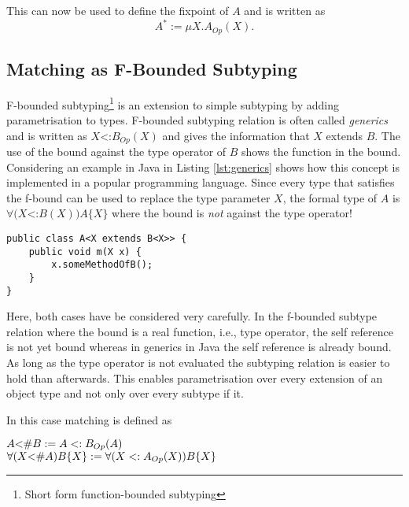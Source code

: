 This can now be used to define the fixpoint of $A$ and is written as \[A^*
:= \mu X.A_{Op}(X).\]


\subsection{Matching as F-Bounded Subtyping}
F-bounded subtyping\footnote{Short form function-bounded subtyping}
is an extension to simple subtyping by adding parametrisation to
types. F-bounded subtyping relation is often called \emph{generics}
and is written as $X$<:$B_{Op}(X)$ and gives the information that $X$
extends $B$. The use of the bound against the type operator of $B$
shows the function in the bound. Considering an example in Java in
Listing \ref{lst:generics} shows how this concept is implemented in a popular
programming language. Since every type that satisfies the f-bound can
be used to replace the type parameter $X$, the formal type of $A$ is
$\forall(X$<:$B(X))A\{X\}$ where the bound is \emph{not} against the 
type operator!

\begin{lstlisting}[float,caption={Universal quantified f-bound in Java},label={lst:generics}]
public class A<X extends B<X>> {
	public void m(X x) {
		x.someMethodOfB();
	}
}
\end{lstlisting}

Here, both cases have be considered very carefully. In the f-bounded subtype
relation where the bound is a real function, i.e., type operator,
the self reference is not yet bound whereas in generics in Java the self
reference is already bound. As long as the type operator is not evaluated
the subtyping relation is easier to hold than afterwards. This enables 
parametrisation over every extension of an object type and not only over
every subtype if it.

In this case matching is defined as\cite{abadi_subtyping_1996}
\begin{defn}
	\label{def:matchingAsBound}
	$A \textnormal{<\#} B := A <: B_{Op}(A)$\\
	$\forall (X \textnormal{<\#} A)B\{X\} := \forall (X <: A_{Op}(X))B\{X\}$
\end{defn}

%

